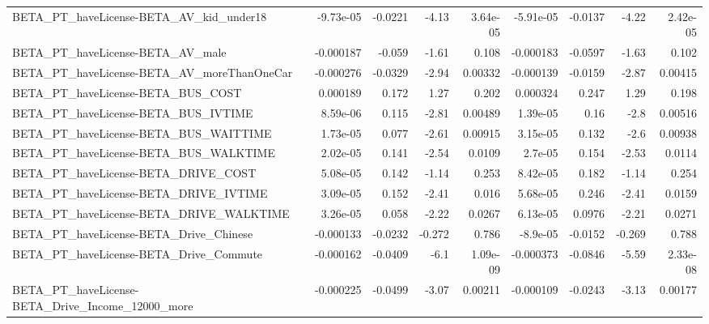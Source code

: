 \begin{tabular}{lrrrrrrrr}
BETA\_PT\_haveLicense-BETA\_AV\_kid\_under18            &   -9.73e-05 &      -0.0221 &     -4.13 & 3.64e-05 &  -5.91e-05 &     -0.0137 &        -4.22 &      2.42e-05 \\
BETA\_PT\_haveLicense-BETA\_AV\_male                   &   -0.000187 &       -0.059 &     -1.61 &    0.108 &  -0.000183 &     -0.0597 &        -1.63 &         0.102 \\
BETA\_PT\_haveLicense-BETA\_AV\_moreThanOneCar         &   -0.000276 &      -0.0329 &     -2.94 &  0.00332 &  -0.000139 &     -0.0159 &        -2.87 &       0.00415 \\
BETA\_PT\_haveLicense-BETA\_BUS\_COST                  &    0.000189 &        0.172 &      1.27 &    0.202 &   0.000324 &       0.247 &         1.29 &         0.198 \\
BETA\_PT\_haveLicense-BETA\_BUS\_IVTIME                &    8.59e-06 &        0.115 &     -2.81 &  0.00489 &   1.39e-05 &        0.16 &         -2.8 &       0.00516 \\
BETA\_PT\_haveLicense-BETA\_BUS\_WAITTIME              &    1.73e-05 &        0.077 &     -2.61 &  0.00915 &   3.15e-05 &       0.132 &         -2.6 &       0.00938 \\
BETA\_PT\_haveLicense-BETA\_BUS\_WALKTIME              &    2.02e-05 &        0.141 &     -2.54 &   0.0109 &    2.7e-05 &       0.154 &        -2.53 &        0.0114 \\
BETA\_PT\_haveLicense-BETA\_DRIVE\_COST                &    5.08e-05 &        0.142 &     -1.14 &    0.253 &   8.42e-05 &       0.182 &        -1.14 &         0.254 \\
BETA\_PT\_haveLicense-BETA\_DRIVE\_IVTIME              &    3.09e-05 &        0.152 &     -2.41 &    0.016 &   5.68e-05 &       0.246 &        -2.41 &        0.0159 \\
BETA\_PT\_haveLicense-BETA\_DRIVE\_WALKTIME            &    3.26e-05 &        0.058 &     -2.22 &   0.0267 &   6.13e-05 &      0.0976 &        -2.21 &        0.0271 \\
BETA\_PT\_haveLicense-BETA\_Drive\_Chinese             &   -0.000133 &      -0.0232 &    -0.272 &    0.786 &   -8.9e-05 &     -0.0152 &       -0.269 &         0.788 \\
BETA\_PT\_haveLicense-BETA\_Drive\_Commute             &   -0.000162 &      -0.0409 &      -6.1 & 1.09e-09 &  -0.000373 &     -0.0846 &        -5.59 &      2.33e-08 \\
BETA\_PT\_haveLicense-BETA\_Drive\_Income\_12000\_more   &   -0.000225 &      -0.0499 &     -3.07 &  0.00211 &  -0.000109 &     -0.0243 &        -3.13 &       0.00177 \\

\end{tabular}
